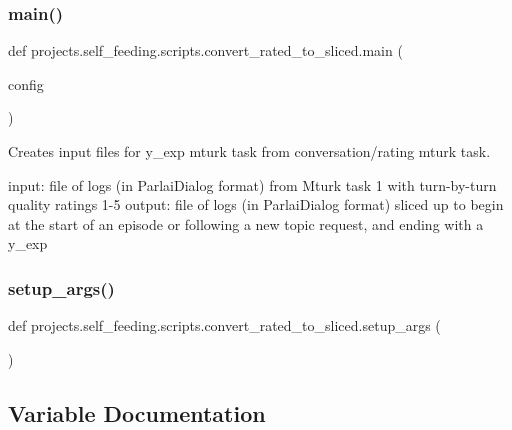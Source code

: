 \subsubsection{\texorpdfstring{main()}{main()}}
{\footnotesize\ttfamily def projects.\+self\+\_\+feeding.\+scripts.\+convert\+\_\+rated\+\_\+to\+\_\+sliced.\+main (\begin{DoxyParamCaption}\item[{}]{config }\end{DoxyParamCaption})}

\begin{DoxyVerb}Creates input files for y_exp mturk task from conversation/rating mturk task.

input: file of logs (in ParlaiDialog format) from Mturk task 1 with turn-by-turn
    quality ratings 1-5
output: file of logs (in ParlaiDialog format) sliced up to begin at the start of
    an episode or following a new topic request, and ending with a y_exp
\end{DoxyVerb}
 \mbox{\label{namespaceprojects_1_1self__feeding_1_1scripts_1_1convert__rated__to__sliced_ae468e6330f1daa2e0ec2408e5049e097}} 
\subsubsection{\texorpdfstring{setup\+\_\+args()}{setup\_args()}}
{\footnotesize\ttfamily def projects.\+self\+\_\+feeding.\+scripts.\+convert\+\_\+rated\+\_\+to\+\_\+sliced.\+setup\+\_\+args (\begin{DoxyParamCaption}{ }\end{DoxyParamCaption})}



\subsection{Variable Documentation}
\mbox{\label{namespaceprojects_1_1self__feeding_1_1scripts_1_1convert__rated__to__sliced_a50446686af692aa6483c3c72bcf433a9}} 
